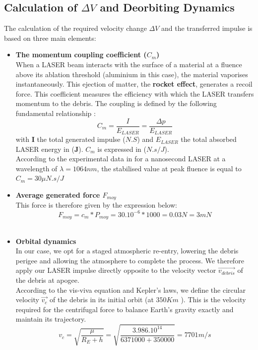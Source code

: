 \subsection{Calculation of $\Delta V$ and Deorbiting Dynamics}
The calculation of the required velocity change $\Delta V$ and the transferred impulse is based on three main elements: \\
\begin{itemize}
    \item \textbf{The momentum coupling coefficient ($C_{m}$)}\\
    When a LASER beam interacts with the surface of a material at a fluence above its ablation threshold (aluminium in this case),
    the material vaporises instantaneously. This ejection of matter, the \textbf{rocket effect}, generates a recoil force. 
    This coefficient measures the efficiency with which the LASER transfers momentum to the debris. The coupling is defined by the following fundamental relationship \cite{Phipps2012}:\\
    \begin{equation}
        \boxed{C_{m} = \frac{I}{E_{LASER}} = \frac{\Delta p}{E_{LASER}}}
    \end{equation}
    with \textbf{I} the total generated impulse (\textbf{$N.S$}) and \textbf{$E_{LASER}$} the total absorbed LASER energy in (\textbf{J}). $C_{m}$ is expressed in (\textbf{$N.s/J$}).\\
    According to the experimental data in \cite{Phipps2012} for a nanosecond LASER at a wavelength of $\lambda = 1064nm$, the stabilised value at peak fluence is equal to $C_{m} = 30 \mu N.s/J$\\

    \item \textbf{Average generated force $F_{moy}$}\\
    This force is therefore given by the expression below:
    \begin{equation}
       \boxed{ F_{moy} = c_{m} * P_{moy} = 30.10^{-6} * 1000 = 0.03N = 3 mN}
    \end{equation}\\

    \item \textbf{Orbital dynamics }\\
    In our case, we opt for a staged atmospheric re-entry, lowering the debris perigee and allowing the atmosphere to complete the process. We therefore apply our LASER impulse directly opposite to the velocity vector \textbf{$\vec{v_{debris}}$} of the debris at apogee.\\
    According to the vis-viva equation and Kepler's laws, we define the circular velocity \textbf{$\vec{{v_{c}}}$} of the debris in its initial orbit (at \textbf{$350 Km$} ).
    This is the velocity required for the centrifugal force to balance Earth's gravity exactly and maintain its trajectory.
    \begin{equation}
       \boxed{ {v_{c}} = \sqrt{\frac{\mu}{R_{E} + h}} = \sqrt{\frac{3.986.10^{14}}{6371000 + 350000}} = 7701 m/s }
    \end{equation}


\end{itemize}
